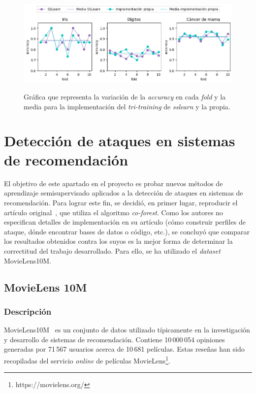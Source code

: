 \begin{figure}[h]
	\caption[\textit{Tri-training}: comparativa contra \textit{sslearn}]{Gráfica que representa la variación de la \textit{accuracy} en cada \textit{fold} y la media para la implementación del \textit{tri-training} de \textit{sslearn} y la propia.}
	\centering
	\includegraphics[scale=0.62]{../img/memoria/5_tritraining_sslearn}
	\label{gr:tt_vs_sslearn}
\end{figure}


\section{Detección de ataques en sistemas de recomendación}

El objetivo de este apartado en el proyecto es probar nuevos métodos de aprendizaje semisupervisado aplicados a la detección de ataques en sistemas de recomendación. Para lograr este fin, se decidió, en primer lugar, reproducir el artículo original~\cite{zhou2021SemisupervisedRecommendationAttack}, que utiliza el algoritmo \textit{co-forest}. Como los autores no especifican detalles de implementación en su artículo (cómo construir perfiles de ataque, dónde encontrar bases de datos o código, etc.), se concluyó que comparar los resultados obtenidos contra los suyos es la mejor forma de determinar la correctitud del trabajo desarrollado. Para ello, se ha utilizado el \textit{dataset} MovieLens10M.

\subsection{MovieLens 10M}
\subsubsection{Descripción}

MovieLens10M~\cite{groupLensDatasets} es un conjunto de datos utilizado típicamente en la investigación y desarrollo de sistemas de recomendación. Contiene 10\,000\,054 opiniones generadas por 71\,567 usuarios acerca de 10\,681 películas. Estas reseñas han sido recopiladas del servicio \textit{online} de películas MovieLens\footnote{https://movielens.org/}.

